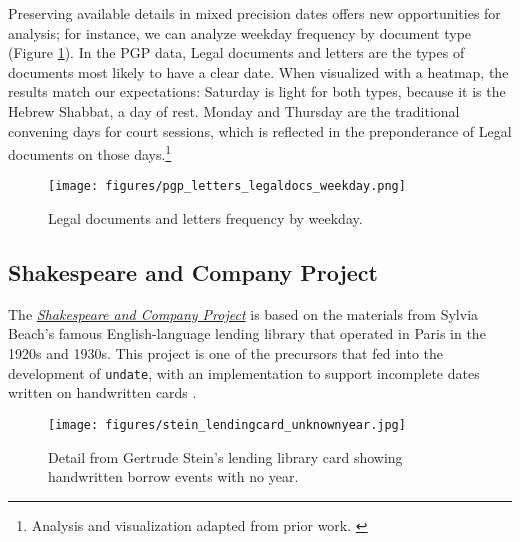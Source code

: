 \documentclass[final]{anthology-ch} %
\begin{document}


Preserving available details in mixed precision dates offers new opportunities for analysis; for instance, we can analyze weekday frequency by document type (Figure \ref{fig:pgp-weekday-frequency}). In the PGP data, Legal documents and letters are the types of documents most likely to have a clear date. When visualized with a heatmap, the results match our expectations: Saturday is light for both types, because it is the Hebrew Shabbat, a day of rest. Monday and Thursday are the traditional convening days for court sessions, which is reflected in the preponderance of Legal documents on those days.\footnote{Analysis and visualization adapted from prior work. \cite{koeser_undate_2025}}

\begin{figure}[h]
  \centering
  \texttt{[image: figures/pgp\_letters\_legaldocs\_weekday.png]}
  \caption{Legal documents and letters frequency by weekday. }
  \label{fig:pgp-weekday-frequency}
\end{figure}


\subsection{Shakespeare and Company
Project}\label{shakespeare-and-company-project}

The \href{https://shakespeareandco.princeton.edu/}{\textit{Shakespeare and Company
Project}} is based on the materials from Sylvia Beach's famous
English-language lending library that operated in Paris in the 1920s
and 1930s. This project is one of the precursors that fed into the development of \texttt{undate}, with
an implementation to support incomplete dates written on handwritten cards \cite{kotin_shakespeare_2022, koeser_coding_2019}.

\begin{figure}[h]
  \centering
  \texttt{[image: figures/stein\_lendingcard\_unknownyear.jpg]}
  \caption{Detail from Gertrude Stein's lending library card showing handwritten borrow events with no year. \cite{stein_beachpapers_pul, noauthor_gertrude_nodate} }
  \label{fig:stein-lending-card}
\end{figure}
\end{document}
